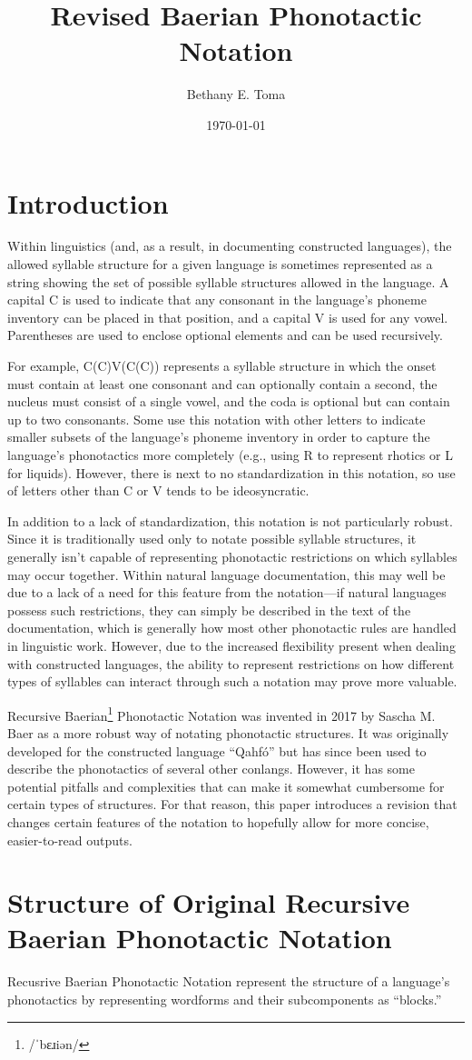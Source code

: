 \documentclass[a4paper,11pt,openany,article]{memoir}
\title{Revised Baerian Phonotactic Notation}
\author{Bethany E. Toma}
\date{\today}
\begin{document}
\pagestyle{empty}

\maketitle

\section{Introduction}

Within linguistics (and, as a result, in documenting constructed languages), the allowed syllable structure for a given language is sometimes represented as a string showing the set of possible syllable structures allowed in the language. A capital C is used to indicate that any consonant in the language's phoneme inventory can be placed in that position, and a capital V is used for any vowel. Parentheses are used to enclose optional elements and can be used recursively. 

For example, C(C)V(C(C)) represents a syllable structure in which the onset must contain at least one consonant and can optionally contain a second, the nucleus must consist of a single vowel, and the coda is optional but can contain up to two consonants. Some use this notation with other letters to indicate smaller subsets of the language's phoneme inventory in order to capture the language's phonotactics more completely (e.g., using R to represent rhotics or L for liquids). However, there is next to no standardization in this notation, so use of letters other than C or V tends to be ideosyncratic.

In addition to a lack of standardization, this notation is not particularly robust. Since it is traditionally used only to notate possible syllable structures, it generally isn't capable of representing phonotactic restrictions on which syllables may occur together. Within natural language documentation, this may well be due to a lack of a need for this feature from the notation---if natural languages possess such restrictions, they can simply be described in the text of the documentation, which is generally how most other phonotactic rules are handled in linguistic work. However, due to the increased flexibility present when dealing with constructed languages, the ability to represent restrictions on how different types of syllables can interact through such a notation may prove more valuable.

Recursive Baerian\footnote{/ˈbɛɹiən/} Phonotactic Notation was invented in 2017 by Sascha M. Baer as a more robust way of notating phonotactic structures. It was originally developed for the constructed language \enquote{Qahfó} but has since been used to describe the phonotactics of several other conlangs. However, it has some potential pitfalls and complexities that can make it somewhat cumbersome for certain types of structures. For that reason, this paper introduces a revision that changes certain features of the notation to hopefully allow for more concise, easier-to-read outputs.

\section{Structure of Original Recursive Baerian Phonotactic Notation}

Recusrive Baerian Phonotactic Notation represent the structure of a language's phonotactics by representing wordforms and their subcomponents as \enquote{blocks.}
\end{document}
